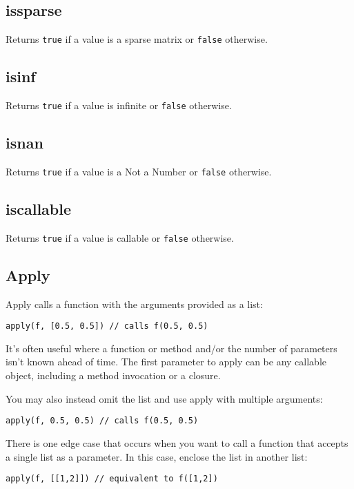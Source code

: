 \hypertarget{issparse}{%
\subsection{issparse}\label{issparse}}

Returns \texttt{true} if a value is a sparse matrix or \texttt{false}
otherwise.

\hypertarget{isinf}{%
\subsection{isinf}\label{isinf}}

Returns \texttt{true} if a value is infinite or \texttt{false}
otherwise.

\hypertarget{isnan}{%
\subsection{isnan}\label{isnan}}

Returns \texttt{true} if a value is a Not a Number or \texttt{false}
otherwise.

\hypertarget{iscallable}{%
\subsection{iscallable}\label{iscallable}}

Returns \texttt{true} if a value is callable or \texttt{false}
otherwise.

\hypertarget{apply}{%
\subsection{Apply}\label{apply}}

Apply calls a function with the arguments provided as a list:

\begin{lstlisting}
apply(f, [0.5, 0.5]) // calls f(0.5, 0.5) 
\end{lstlisting}

It's often useful where a function or method and/or the number of
parameters isn't known ahead of time. The first parameter to apply can
be any callable object, including a method invocation or a closure.

You may also instead omit the list and use apply with multiple
arguments:

\begin{lstlisting}
apply(f, 0.5, 0.5) // calls f(0.5, 0.5)
\end{lstlisting}

There is one edge case that occurs when you want to call a function that
accepts a single list as a parameter. In this case, enclose the list in
another list:

\begin{lstlisting}
apply(f, [[1,2]]) // equivalent to f([1,2])
\end{lstlisting}
